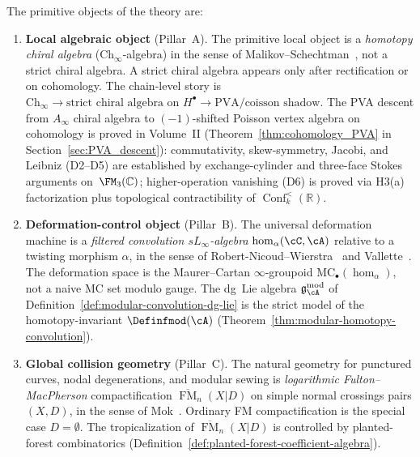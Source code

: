 \begin{remark}
\label{rem:three-pillars}
The primitive objects of the theory are:
\begin{enumerate}[label=\textup{(\Alph*)}]
\item \textbf{Local algebraic object} (Pillar~A).  The primitive local
  object is a \emph{homotopy chiral algebra}
  ($\mathrm{Ch}_\infty$-algebra) in the sense of
  Malikov--Schechtman~\cite{MS24}, not a strict chiral algebra.  A strict
  chiral algebra appears only after rectification or on cohomology.
  The chain-level story is
  $\mathrm{Ch}_\infty \to \text{strict chiral algebra on } H^\bullet
  \to \text{PVA/coisson shadow}$.
  The PVA descent from $A_\infty$ chiral algebra to $(-1)$-shifted
  Poisson vertex algebra on cohomology is proved in Volume~II
  (Theorem~\ref{thm:cohomology_PVA} in Section~\ref{sec:PVA_descent}):
  commutativity, skew-symmetry, Jacobi, and Leibniz (D2--D5) are
  established by exchange-cylinder and three-face Stokes arguments
  on~$\FM_3(\mathbb{C})$; higher-operation vanishing (D6) is proved
  via H3(a) factorization plus topological contractibility of
  $\operatorname{Conf}_k^{<}(\mathbb{R})$.
\item \textbf{Deformation-control object} (Pillar~B).  The universal
  deformation machine is a \emph{filtered convolution $sL_\infty$-algebra}
  $\operatorname{hom}_\alpha(\cC, \cA)$ relative to a twisting morphism
  $\alpha$, in the sense of Robert-Nicoud--Wierstra~\cite{RNW19} and
  Vallette~\cite{Val16}.  The deformation space is the Maurer--Cartan
  $\infty$-groupoid $\mathrm{MC}_\bullet(\operatorname{hom}_\alpha)$,
  not a naive MC set modulo gauge.
  The dg~Lie algebra $\mathfrak{g}_\cA^{\mathrm{mod}}$ of
  Definition~\ref{def:modular-convolution-dg-lie} is the strict model of
  the homotopy-invariant $\Definfmod(\cA)$
  (Theorem~\ref{thm:modular-homotopy-convolution}).
\item \textbf{Global collision geometry} (Pillar~C).  The natural
  geometry for punctured curves, nodal degenerations, and modular sewing
  is \emph{logarithmic Fulton--MacPherson} compactification
  $\overline{\operatorname{FM}}_n(X|D)$ on simple normal crossings pairs
  $(X, D)$, in the sense of Mok~\cite{Mok25}.  Ordinary FM
  compactification is the special case $D = \emptyset$.  The
  tropicalization of $\overline{\operatorname{FM}}_n(X|D)$ is controlled
  by planted-forest combinatorics
  (Definition~\ref{def:planted-forest-coefficient-algebra}).
\end{enumerate}
\end{remark}

